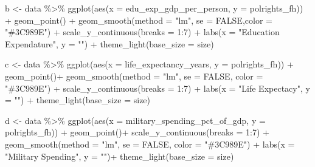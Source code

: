 \documentclass[
  english,
  man,floatsintext]{apa6}
\newenvironment{Shaded}{\begin{snugshade}}{\end{snugshade}}
\newcommand{\AttributeTok}[1]{\textcolor[rgb]{0.77,0.63,0.00}{#1}}
\newcommand{\ConstantTok}[1]{\textcolor[rgb]{0.00,0.00,0.00}{#1}}
\newcommand{\DecValTok}[1]{\textcolor[rgb]{0.00,0.00,0.81}{#1}}
\newcommand{\FunctionTok}[1]{\textcolor[rgb]{0.00,0.00,0.00}{#1}}
\newcommand{\NormalTok}[1]{#1}
\newcommand{\OtherTok}[1]{\textcolor[rgb]{0.56,0.35,0.01}{#1}}
\newcommand{\SpecialCharTok}[1]{\textcolor[rgb]{0.00,0.00,0.00}{#1}}
\newcommand{\StringTok}[1]{\textcolor[rgb]{0.31,0.60,0.02}{#1}}
\begin{document}
\begin{Shaded}
\begin{Highlighting}[]
\NormalTok{b }\OtherTok{\textless{}{-}}\NormalTok{ data }\SpecialCharTok{\%\textgreater{}\%} 
  \FunctionTok{ggplot}\NormalTok{(}\FunctionTok{aes}\NormalTok{(}\AttributeTok{x =}\NormalTok{ edu\_exp\_gdp\_per\_person, }\AttributeTok{y =}\NormalTok{ polrights\_fh)) }\SpecialCharTok{+} 
  \FunctionTok{geom\_point}\NormalTok{() }\SpecialCharTok{+} 
  \FunctionTok{geom\_smooth}\NormalTok{(}\AttributeTok{method =} \StringTok{"lm"}\NormalTok{, }\AttributeTok{se =} \ConstantTok{FALSE}\NormalTok{,}\AttributeTok{color =} \StringTok{"\#3C989E"}\NormalTok{) }\SpecialCharTok{+}
    \FunctionTok{scale\_y\_continuous}\NormalTok{(}\AttributeTok{breaks =} \DecValTok{1}\SpecialCharTok{:}\DecValTok{7}\NormalTok{) }\SpecialCharTok{+} 
  \FunctionTok{labs}\NormalTok{(}\AttributeTok{x =} \StringTok{"Education Expendature"}\NormalTok{, }\AttributeTok{y =} \StringTok{""}\NormalTok{) }\SpecialCharTok{+}
  \FunctionTok{theme\_light}\NormalTok{(}\AttributeTok{base\_size =}\NormalTok{ size)}

\NormalTok{c }\OtherTok{\textless{}{-}}\NormalTok{ data }\SpecialCharTok{\%\textgreater{}\%} 
  \FunctionTok{ggplot}\NormalTok{(}\FunctionTok{aes}\NormalTok{(}\AttributeTok{x =}\NormalTok{ life\_expectancy\_years, }\AttributeTok{y =}\NormalTok{ polrights\_fh)) }\SpecialCharTok{+} 
  \FunctionTok{geom\_point}\NormalTok{()}\SpecialCharTok{+} 
  \FunctionTok{geom\_smooth}\NormalTok{(}\AttributeTok{method =} \StringTok{"lm"}\NormalTok{, }\AttributeTok{se =} \ConstantTok{FALSE}\NormalTok{, }\AttributeTok{color =} \StringTok{"\#3C989E"}\NormalTok{) }\SpecialCharTok{+}
    \FunctionTok{scale\_y\_continuous}\NormalTok{(}\AttributeTok{breaks =} \DecValTok{1}\SpecialCharTok{:}\DecValTok{7}\NormalTok{) }\SpecialCharTok{+} 
  \FunctionTok{labs}\NormalTok{(}\AttributeTok{x =} \StringTok{"Life Expectacy"}\NormalTok{, }\AttributeTok{y =} \StringTok{""}\NormalTok{) }\SpecialCharTok{+}
  \FunctionTok{theme\_light}\NormalTok{(}\AttributeTok{base\_size =}\NormalTok{ size)}

\NormalTok{d }\OtherTok{\textless{}{-}}\NormalTok{ data }\SpecialCharTok{\%\textgreater{}\%} 
  \FunctionTok{ggplot}\NormalTok{(}\FunctionTok{aes}\NormalTok{(}\AttributeTok{x =}\NormalTok{ military\_spending\_pct\_of\_gdp, }\AttributeTok{y =}\NormalTok{ polrights\_fh)) }\SpecialCharTok{+} 
  \FunctionTok{geom\_point}\NormalTok{()}\SpecialCharTok{+} 
  \FunctionTok{scale\_y\_continuous}\NormalTok{(}\AttributeTok{breaks =} \DecValTok{1}\SpecialCharTok{:}\DecValTok{7}\NormalTok{) }\SpecialCharTok{+} 
  \FunctionTok{geom\_smooth}\NormalTok{(}\AttributeTok{method =} \StringTok{"lm"}\NormalTok{, }\AttributeTok{se =} \ConstantTok{FALSE}\NormalTok{, }\AttributeTok{color =} \StringTok{"\#3C989E"}\NormalTok{) }\SpecialCharTok{+} 
  \FunctionTok{labs}\NormalTok{(}\AttributeTok{x =} \StringTok{"Military Spending"}\NormalTok{, }\AttributeTok{y =} \StringTok{""}\NormalTok{)}\SpecialCharTok{+} \FunctionTok{theme\_light}\NormalTok{(}\AttributeTok{base\_size =}\NormalTok{ size)}


\end{Highlighting}
\end{Shaded}
\end{document}
